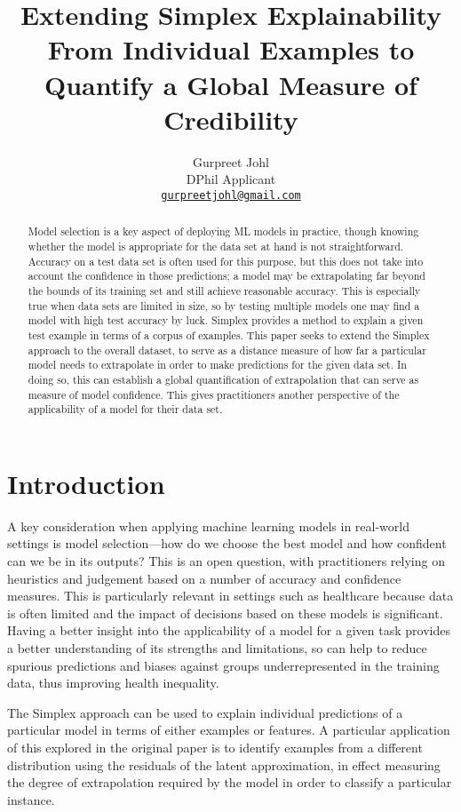 \documentclass{article}
\title{Extending Simplex Explainability From Individual Examples to Quantify a Global Measure of Credibility}
\author{%
  Gurpreet Johl \\
  DPhil Applicant \\
  \href{mailto:gurpreetjohl@gmail.com}{\texttt{gurpreetjohl@gmail.com}}
}
\begin{document}
\maketitle

\begin{abstract}
 Model selection is a key aspect of deploying ML models in practice, though knowing whether the model is appropriate for the data set at hand is not straightforward. Accuracy on a test data set is often used for this purpose, but this does not take into account the confidence in those predictions; a model may be extrapolating far beyond the bounds of its training set and still achieve reasonable accuracy. This is especially true when data sets are limited in size, so by testing multiple models one may find a model with high test accuracy by luck. Simplex provides a method to explain a given test example in terms of a corpus of examples. This paper seeks to extend the Simplex approach to the overall dataset, to serve as a distance measure of how far a particular model needs to extrapolate in order to make predictions for the given data set. In doing so, this can establish a global quantification of extrapolation that can serve as measure of model confidence. This gives practitioners another perspective of the applicability of a model for their data set.
\end{abstract}


\section{Introduction}

A key consideration when applying machine learning models in real-world settings is model selection---how do we choose the best model and how confident can we be in its outputs? This is an open question, with practitioners relying on heuristics and judgement based on a number of accuracy and confidence measures\cite{ding_model_2018}\cite{raschka_model_2020}.
This is particularly relevant in settings such as healthcare because data is often limited and the impact of decisions based on these models is significant. Having a better insight into the applicability of a model for a given task provides a better understanding of its strengths and limitations, so can help to reduce spurious predictions and biases against groups underrepresented in the training data, thus improving health inequality.

The Simplex approach \cite{crabbe_explaining_2021} can be used to explain individual predictions of a particular model in terms of either examples or features. A particular application of this explored in the original paper is to identify examples from a different distribution using the residuals of the latent approximation, in effect measuring the degree of extrapolation required by the model in order to classify a particular instance.
\end{document}
